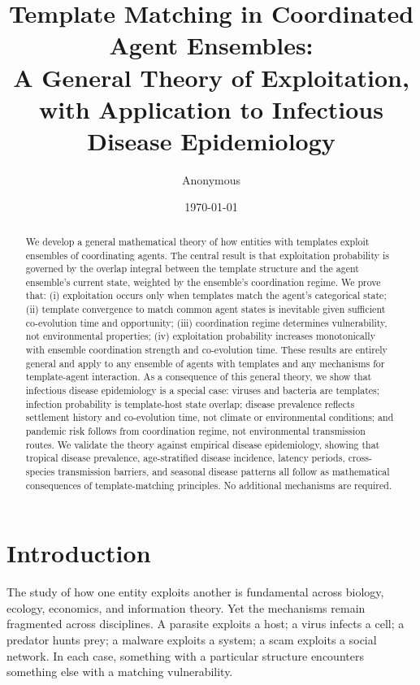 \documentclass[11pt,twocolumn,a4paper]{article}
\title{\textbf{Template Matching in Coordinated Agent Ensembles:\\
A General Theory of Exploitation, with Application to Infectious Disease Epidemiology}}
\author{Anonymous}
\date{\today}
\begin{document}
\maketitle

\begin{abstract}
We develop a general mathematical theory of how entities with templates exploit ensembles of coordinating agents. The central result is that exploitation probability is governed by the overlap integral between the template structure and the agent ensemble's current state, weighted by the ensemble's coordination regime. We prove that: (i) exploitation occurs only when templates match the agent's categorical state; (ii) template convergence to match common agent states is inevitable given sufficient co-evolution time and opportunity; (iii) coordination regime determines vulnerability, not environmental properties; (iv) exploitation probability increases monotonically with ensemble coordination strength and co-evolution time. These results are entirely general and apply to any ensemble of agents with templates and any mechanisms for template-agent interaction. As a consequence of this general theory, we show that infectious disease epidemiology is a special case: viruses and bacteria are templates; infection probability is template-host state overlap; disease prevalence reflects settlement history and co-evolution time, not climate or environmental conditions; and pandemic risk follows from coordination regime, not environmental transmission routes. We validate the theory against empirical disease epidemiology, showing that tropical disease prevalence, age-stratified disease incidence, latency periods, cross-species transmission barriers, and seasonal disease patterns all follow as mathematical consequences of template-matching principles. No additional mechanisms are required.
\end{abstract}

\section{Introduction}
\label{sec:intro}

The study of how one entity exploits another is fundamental across biology, ecology, economics, and information theory. Yet the mechanisms remain fragmented across disciplines. A parasite exploits a host; a virus infects a cell; a predator hunts prey; a malware exploits a system; a scam exploits a social network. In each case, something with a particular structure encounters something else with a matching vulnerability.
\end{document}
